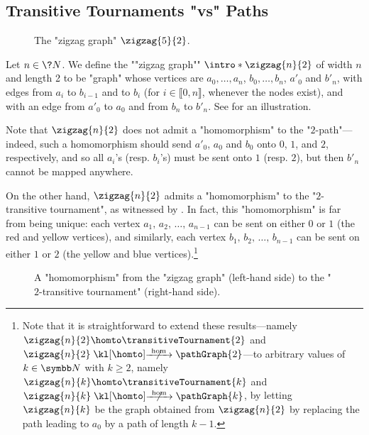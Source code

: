 \subsection{Transitive Tournaments "vs" Paths}

\begin{figure}
	\centering
	\begin{tikzpicture}
		
		
	\end{tikzpicture}
	\caption{\AP\label{fig:zigzag-graph}The "zigzag graph" $\zigzag{5}{2}$.}
\end{figure}
\begin{example}
	\AP\label{ex:zigzag-defn}
	Let $n\in\?N$.
	We define the \AP""zigzag graph"" $\intro*\zigzag{n}{2}$ of width $n$ and length 2
	to be "graph" whose vertices are $a_0, \hdots, a_n$, $b_0, \hdots, b_{n}$,
	$a'_0$ and $b'_n$, with edges from $a_i$ to $b_{i-1}$ and to $b_{i}$ (for $i \in \lBrack 0,n\rBrack$, whenever the nodes exist), and with an edge from $a'_0$ to $a_0$ and from $b_n$
	to $b'_n$. See  for an illustration.
	
	Note that $\zigzag{n}{2}$ does not admit a "homomorphism" to the "$2$-path"---indeed, such a homomorphism should send $a'_0$, $a_0$ and $b_0$ onto $0$, $1$, and $2$, respectively, 
	and so all $a_i$'s (resp. $b_i$'s) must be sent onto $1$ (resp. $2$), but then $b'_n$ cannot be mapped anywhere.

	On the other hand, $\zigzag{n}{2}$ admits a "homomorphism" to the "$2$-transitive tournament", as witnessed by .
	In fact, this "homomorphism" is far from being unique:
	each vertex $a_1,\,a_2,\,\hdots,\,a_{n-1}$ can be sent on either $0$ or $1$
	(the red and yellow vertices), 
	and similarly, each vertex $b_1,\,b_2,\,\hdots,\,b_{n-1}$ can be sent on either $1$ or $2$
	(the yellow and blue vertices).\footnote{Note that it is straightforward
	to extend these results---namely $\zigzag{n}{2} \homto \transitiveTournament{2}$
	and $\zigzag{n}{2} \nothomto \pathGraph{2}$---to arbitrary values of $k\in \N$ with
	$k\geq 2$, namely $\zigzag{n}{k} \homto \transitiveTournament{k}$
	and $\zigzag{n}{k} \nothomto \pathGraph{k}$, by letting
	$\zigzag{n}{k}$ be the graph obtained from $\zigzag{n}{2}$ by
	replacing the path leading to $a_0$ by a path of length $k-1$.
	}
\end{example}
\begin{figure}
	\centering 
	\begin{tikzpicture}
		
	\end{tikzpicture}
	\caption{\AP\label{fig:zigzag-graph-hom-T2}A "homomorphism" from the "zigzag graph" (left-hand side) to the "$2$-transitive tournament" (right-hand side).}
\end{figure}